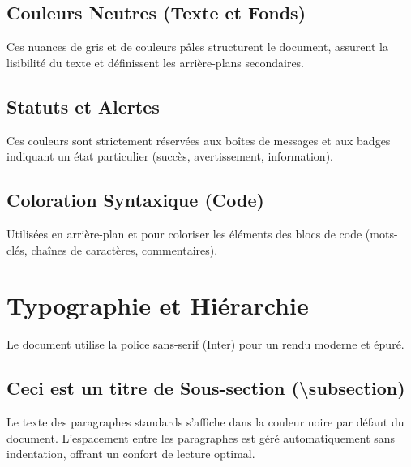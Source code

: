 \documentclass[theme=myrtille]{myrtille}
\begin{document}
\vspace{0.5cm}
\noindent
{}

\subsection{Couleurs Neutres (Texte et Fonds)}
Ces nuances de gris et de couleurs pâles structurent le document, assurent la lisibilité du texte et définissent les arrière-plans secondaires.

\vspace{0.5cm}
\noindent
{}

\subsection{Statuts et Alertes}
Ces couleurs sont strictement réservées aux boîtes de messages et aux badges indiquant un état particulier (succès, avertissement, information).

\vspace{0.5cm}
\noindent
{}

\subsection{Coloration Syntaxique (Code)}
Utilisées en arrière-plan et pour coloriser les éléments des blocs de code (mots-clés, chaînes de caractères, commentaires).

\vspace{0.5cm}
\noindent
{}

\section{Typographie et Hiérarchie}
Le document utilise la police sans-serif (Inter) pour un rendu moderne et épuré.

\subsection{Ceci est un titre de Sous-section (\textbackslash subsection)}
Le texte des paragraphes standards s'affiche dans la couleur noire par défaut du document. L'espacement entre les paragraphes est géré automatiquement sans indentation, offrant un confort de lecture optimal.
\end{document}
